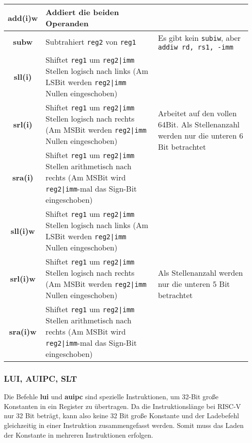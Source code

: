 \begin{tabular}{|c|p{8cm}|p{4cm}|}
	\hline
	\textbf{add(i)w} & Addiert die beiden Operanden & \\
	\hline
	\textbf{subw} & Subtrahiert \texttt{reg2} von \texttt{reg1}& Es gibt kein \texttt{subiw}, aber \texttt{addiw rd, rs1, -imm} \\
	\hline
	\textbf{sll(i)} & Shiftet \texttt{reg1} um \texttt{reg2|imm} Stellen logisch nach links (Am LSBit werden \texttt{reg2|imm} Nullen eingeschoben) & \multirow{3}{4cm}{Arbeitet auf den vollen 64Bit. Als Stellenanzahl werden nur die unteren 6 Bit betrachtet} \\
	\cline{1-2}
	\textbf{srl(i)} & Shiftet \texttt{reg1} um \texttt{reg2|imm} Stellen logisch nach rechts (Am MSBit werden \texttt{reg2|imm} Nullen eingeschoben) & \\
	\cline{1-2}
	\textbf{sra(i)} & Shiftet \texttt{reg1} um \texttt{reg2|imm} Stellen arithmetisch nach rechts (Am MSBit wird \texttt{reg2|imm}-mal das Sign-Bit eingeschoben) & \\
	\hline
	\textbf{sll(i)w} & Shiftet \texttt{reg1} um \texttt{reg2|imm} Stellen logisch nach links (Am LSBit werden \texttt{reg2|imm} Nullen eingeschoben) & \multirow{3}{4cm}{Als Stellenanzahl werden nur die unteren 5 Bit betrachtet} \\
	\cline{1-2}
	\textbf{srl(i)w} & Shiftet \texttt{reg1} um \texttt{reg2|imm} Stellen logisch nach rechts (Am MSBit werden \texttt{reg2|imm} Nullen eingeschoben) & \\
	\cline{1-2}
	\textbf{sra(i)w} & Shiftet \texttt{reg1} um \texttt{reg2|imm} Stellen arithmetisch nach rechts (Am MSBit wird \texttt{reg2|imm}-mal das Sign-Bit eingeschoben) & \\
	\hline
\end{tabular}

\subsubsection{LUI, AUIPC, SLT}

Die Befehle \textbf{lui} und \textbf{auipc} sind spezielle Instruktionen, um 32-Bit große
Konstanten in ein Register zu übertragen. Da die Instruktionslänge bei RISC-V nur
32 Bit beträgt, kann also keine 32 Bit große Konstante und der Ladebefehl
gleichzeitig in einer Instruktion zusammengefasst werden. Somit muss das Laden
der Konstante in mehreren Instruktionen erfolgen.\\

